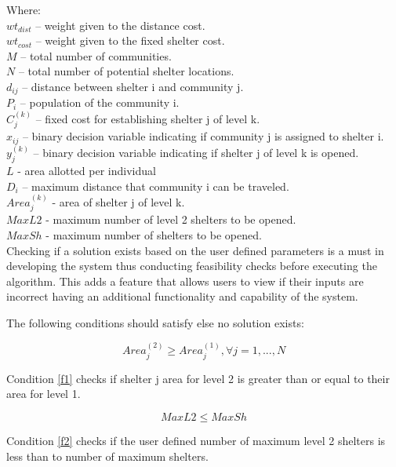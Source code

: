 \documentclass[11pt,letterpaper,]{article}
\begin{document}
	\noindent Where:
	\\$wt_{dist}$ – weight given to the distance cost.
	\\$wt_{cost}$ – weight given to the fixed shelter cost.
	\\$M$ – total number of communities.
	\\$N$ – total number of potential shelter locations.
	\\$d_{ij}$ – distance between shelter i and community j.
	\\$P_{i}$ – population of the community i.
	\\$C_{j}^{(k)}$ – fixed cost for establishing shelter j of level k.
	\\$x_{ij}$ – binary decision variable indicating if community j is assigned to shelter i.
	\\$y_{j}^{(k)}$ – binary decision variable indicating if shelter j of level k is opened.
	\\$L$ - area allotted per individual
	\\$D_{i}$ – maximum distance that community i can be traveled.
	\\$Area_{j}^{(k)}$ - area of shelter j of level k.
	\\$MaxL2$ - maximum number of level 2 shelters to be opened.
	\\$MaxSh$ - maximum number of shelters to be opened.
	\\
	
	Checking if a solution exists based on the user defined parameters is a must in developing the system thus conducting feasibility checks before executing the algorithm. This adds a feature that allows users to view if their inputs are incorrect having an additional functionality and capability of the system.
	
	The following conditions should satisfy else no solution exists:
	
	\begin{equation} 
		\label{f1}
		Area_{j}^{(2)} \ge Area_{j}^{(1)}, \forall j = 1, ..., N
	\end{equation}
	
	Condition \ref{f1} checks if shelter j area for level 2 is greater than or equal to their area for level 1. 
	
	\begin{equation} 
		\label{f2}
		MaxL2 \le MaxSh
	\end{equation}
	
	Condition \ref{f2} checks if the user defined number of maximum level 2 shelters is less than to number of maximum shelters.
	
\end{document}
